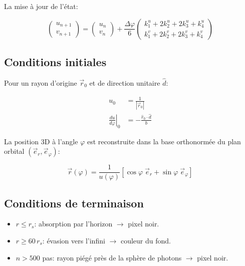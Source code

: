 \documentclass[12pt, a4paper]{article}
\begin{document}
La mise à jour de l'état:

\begin{equation}
    \begin{pmatrix} u_{n+1} \\ v_{n+1} \end{pmatrix}
    = 
    \begin{pmatrix} u_n \\ v_n \end{pmatrix}
    + \frac{\Delta\varphi}{6}
    \begin{pmatrix}
        k_1^u + 2k_2^u + 2k_3^u + k_4^u \\
        k_1^v + 2k_2^v + 2k_3^v + k_4^v
    \end{pmatrix}
\end{equation}

\subsection{Conditions initiales}

Pour un rayon d'origine $\vec{r}_0$ et de direction unitaire $\hat{d}$:

\begin{align}
    u_0 &= \frac{1}{|\vec{r}_0|} \\
    \left.\frac{du}{d\varphi}\right|_0 &= -\frac{\hat{r}_0 \cdot \hat{d}}{b}
\end{align}

La position 3D à l'angle $\varphi$ est reconstruite dans la base orthonormée
du plan orbital $(\vec{e}_r, \vec{e}_\varphi)$:

\begin{equation}
    \vec{r}(\varphi) = \frac{1}{u(\varphi)}
    \left[\cos\varphi\;\vec{e}_r + \sin\varphi\;\vec{e}_\varphi\right]
\end{equation}

\subsection{Conditions de terminaison}

\begin{itemize}
    \item $r \leq r_s$: absorption par l'horizon $\rightarrow$ pixel noir.
    \item $r \geq 60\,r_s$: évasion vers l'infini $\rightarrow$ couleur du fond.
    \item $n > 500$ pas: rayon piégé près de la sphère de photons $\rightarrow$ pixel noir. 
\end{itemize}
\end{document}
